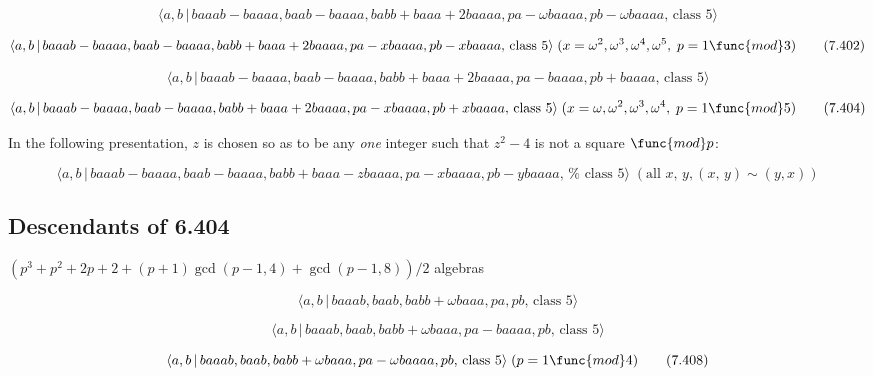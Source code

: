 \documentclass[10pt]{article}
\begin{document}
\begin{equation}
\langle a,b\,|\,baaab-baaaa,baab-baaaa,babb+baaa+2baaaa,pa-\omega
baaaa,pb-\omega baaaa,\,\text{class }5\rangle  \tag{7.401}
\end{equation}

\begin{equation}
\langle
a,b\,|\,baaab-baaaa,baab-baaaa,babb+baaa+2baaaa,pa-xbaaaa,pb-xbaaaa,\,\text{%
class }5\rangle \;(x=\omega ^{2},\omega ^{3},\omega ^{4},\omega ^{5},\;p=1%
\func{mod}3)  \tag{7.402}
\end{equation}

\begin{equation}
\langle a,b\,|\,baaab-baaaa,baab-baaaa,babb+baaa+2baaaa,pa-baaaa,pb+baaaa,\,%
\text{class }5\rangle  \tag{7.403}
\end{equation}

\begin{equation}
\langle
a,b\,|\,baaab-baaaa,baab-baaaa,babb+baaa+2baaaa,pa-xbaaaa,pb+xbaaaa,\,\text{%
class }5\rangle \;(x=\omega ,\omega ^{2},\omega ^{3},\omega ^{4},\;p=1\func{%
mod}5)  \tag{7.404}
\end{equation}

In the following presentation, $z$ is chosen so as to be any \emph{one}
integer such that $z^{2}-4$ is not a square $\func{mod}p$:

\begin{equation}
\langle
a,b\,|\,baaab-baaaa,baab-baaaa,babb+baaa-zbaaaa,pa-xbaaaa,pb-ybaaaa,\,\text{%
class }5\rangle \;(\text{all }x,\,y,(x,\,y)\sim (y,x))  \tag{7.405}
\end{equation}

\subsection{Descendants of 6.404}

$(p^{3}+p^{2}+2p+2+(p+1)\gcd (p-1,4)+\gcd (p-1,8))/2$ algebras

\begin{equation}
\langle a,b\,|\,baaab,baab,babb+\omega baaa,pa,pb,\,\text{class }5\rangle 
\tag{7.406}
\end{equation}

\begin{equation}
\langle a,b\,|\,baaab,baab,babb+\omega baaa,pa-baaaa,pb,\,\text{class }%
5\rangle  \tag{7.407}
\end{equation}

\begin{equation}
\langle a,b\,|\,baaab,baab,babb+\omega baaa,pa-\omega baaaa,pb,\,\text{class 
}5\rangle \;(p=1\func{mod}4)  \tag{7.408}
\end{equation}
\end{document}
